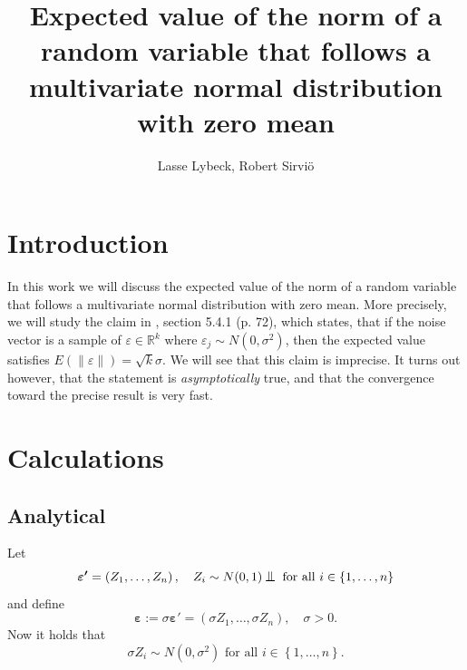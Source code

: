 \documentclass[12pt,a4]{article}
\title{Expected value of the norm of a random variable that follows a multivariate normal distribution with zero mean}
\author{Lasse Lybeck, Robert Sirviö}
\newcommand{\R}{{\mathbb R}}
\newcommand{\lnorm}{\left\|}
\newcommand{\rnorm}{\right\|}
\newcommand{\eps}{\ensuremath{\varepsilon}}
\newcommand{\vc}[1]{\ensuremath{\bm{#1}}}
\newcommand*{\bigCI}{%
  \mathrel{\text{%
    {\rotatebox[origin=c]{90}{\resizebox{2.25ex}{1.65ex}{$\vDash$}}}%
  }}%
}
\begin{document}
\maketitle

\section{Introduction}

In this work we will discuss the expected value of the norm of a random variable that follows a multivariate normal distribution with zero mean. More precisely, we will study the claim in \cite{samu}, section 5.4.1 (p. 72), which states, that if the noise vector is a sample of $\eps \in \R^k$ where $\eps_j \sim N(0, \sigma^2)$, then the expected value satisfies $E \left( \lnorm \eps \rnorm \right) = \sqrt{k} \sigma$. We will see that this claim is imprecise. It turns out however, that the statement is \emph{asymptotically} true, and that the convergence toward the precise result is very fast.

\section{Calculations}
\label{sec:calc}


\subsection{Analytical}
\label{sec:analytical}
Let
\begin{equation}
\vc{\eps'} = \left(Z_1, \ldots, Z_n \right), \quad Z_i \sim N(0,1) \bigCI \text{ for all }
i \in \left\{1, \ldots, n\right\} 
\end{equation}
and define
\begin{equation}
\label{eq:epsdef}
\vc{\eps} := \sigma \vc{\eps'} = \left(\sigma Z_1, \ldots, \sigma Z_n \right), \quad \sigma > 0.
\end{equation}
Now it holds that
\begin{equation}
\sigma Z_i \sim N\left(0,\sigma^2\right) \text{ for all }
i \in \left\{1, \ldots, n\right\}.
\end{equation}
\end{document}
